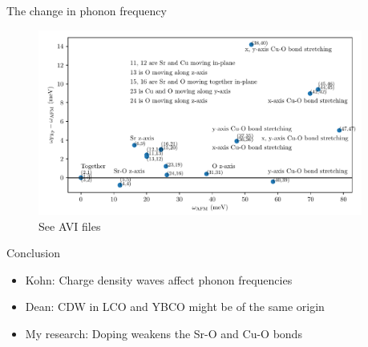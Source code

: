 \documentclass{beamer}
\begin{document}
\begin{frame}{The change in phonon frequency}
\begin{figure}
\includegraphics[width=4.2in]{figs/sco_afm_flip_freq.pdf}
\caption{\label{fig:sco_afm_flip_freq} See AVI files}
\end{figure}
\end{frame}

\begin{frame}{Conclusion}
\begin{itemize}
\item Kohn: Charge density waves affect phonon frequencies
\item Dean: CDW in LCO and YBCO might be of the same origin
\item My research: Doping weakens the Sr-O and Cu-O bonds
\end{itemize}
\end{frame}
\end{document}

